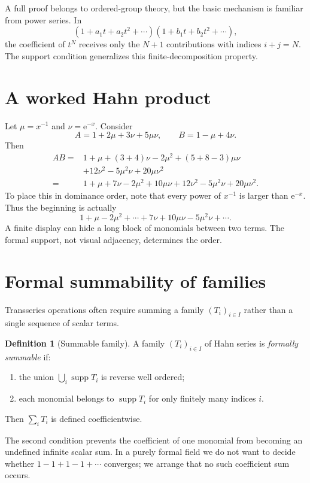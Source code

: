\documentclass[11pt,openany]{book}
\theoremstyle{definition}
\newtheorem{definition}{Definition}[chapter]
\theoremstyle{plain}
\theoremstyle{remark}
\newcommand{\e}{\mathrm{e}}
\DeclareMathOperator{\supp}{supp}
\begin{document}
A full proof belongs to ordered-group theory, but the basic mechanism is familiar from power series. In
\[
 (1+a_1t+a_2t^2+\cdots)(1+b_1t+b_2t^2+\cdots),
\]
the coefficient of $t^N$ receives only the $N+1$ contributions with indices $i+j=N$. The support condition generalizes this finite-decomposition property.

\section{A worked Hahn product}

Let $\mu=x^{-1}$ and $\nu=\e^{-x}$. Consider
\[
 A=1+2\mu+3\nu+5\mu\nu,
 \qquad
 B=1-\mu+4\nu.
\]
Then
\begin{align*}
 AB={}&1+\mu+(3+4)\nu
 -2\mu^2 +(5+8-3)\mu\nu\\
 &+12\nu^2-5\mu^2\nu+20\mu\nu^2\\
 ={}&1+\mu+7\nu-2\mu^2+10\mu\nu
 +12\nu^2-5\mu^2\nu+20\mu\nu^2.
\end{align*}
To place this in dominance order, note that every power of $x^{-1}$ is larger than $\e^{-x}$. Thus the beginning is actually
\[
 1+\mu-2\mu^2+\cdots+7\nu+10\mu\nu-5\mu^2\nu+\cdots.
\]
A finite display can hide a long block of monomials between two terms. The formal support, not visual adjacency, determines the order.

\section{Formal summability of families}

Transseries operations often require summing a family $(T_i)_{i\in I}$ rather than a single sequence of scalar terms.

\begin{definition}[Summable family]
A family $(T_i)_{i\in I}$ of Hahn series is \emph{formally summable} if:
\begin{enumerate}
\item the union $\bigcup_i\supp T_i$ is reverse well ordered;
\item each monomial belongs to $\supp T_i$ for only finitely many indices $i$.
\end{enumerate}
Then $\sum_iT_i$ is defined coefficientwise.
\end{definition}

The second condition prevents the coefficient of one monomial from becoming an undefined infinite scalar sum. In a purely formal field we do not want to decide whether
\(
 1-1+1-1+\cdots
\)
converges; we arrange that no such coefficient sum occurs.
\end{document}
